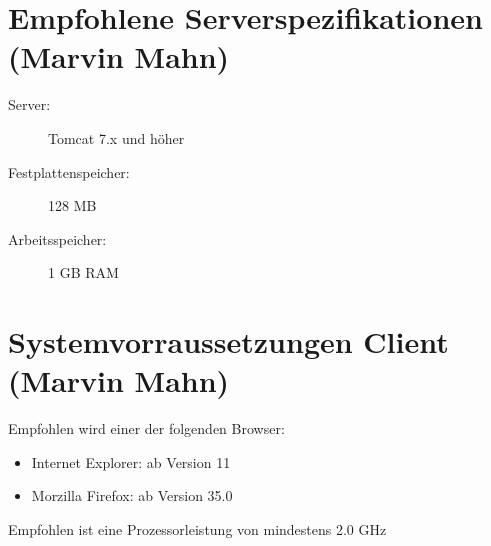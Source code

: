\documentclass[a4paper,12pt]{scrreprt}
\begin{document}
	\section{Empfohlene Serverspezifikationen (Marvin Mahn)}
	\begin{description}
		\item[Server:] Tomcat 7.x und h\"oher
		\item[Festplattenspeicher:] 128 MB
		\item[Arbeitsspeicher:] 1 GB RAM
	\end{description}
	\section{Systemvorraussetzungen Client (Marvin Mahn)}
	Empfohlen wird einer der folgenden Browser:
	\begin{itemize}
		\item Internet Explorer: ab Version 11
		\item Morzilla Firefox: ab Version 35.0
	\end{itemize}
	Empfohlen ist eine Prozessorleistung von mindestens 2.0 GHz
\end{document}

